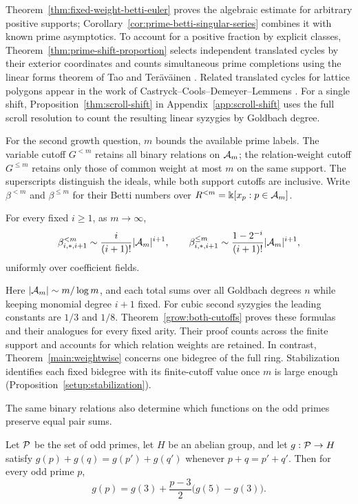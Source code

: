 Theorem~\ref{thm:fixed-weight-betti-euler} proves the algebraic estimate
for arbitrary positive supports; Corollary~\ref{cor:prime-betti-singular-series}
combines it with known prime asymptotics. To account for a positive
fraction by explicit classes, Theorem~\ref{thm:prime-shift-proportion}
selects independent translated cycles by their exterior coordinates
and counts simultaneous prime completions using the linear forms
theorem of Tao and Ter\"av\"ainen \cite[Thm.~1.6]{TT}.
Related
translated cycles for lattice polygons appear in the work of
Castryck--Cools--Demeyer--Lemmens \cite[Secs.~4.1--4.2]{CCDL19}.
For a single shift, Proposition~\ref{thm:scroll-shift} in
Appendix~\ref{app:scroll-shift} uses the full scroll resolution to count
the resulting linear syzygies by Goldbach degree.

For the second growth question, $m$ bounds the available prime labels.
The variable cutoff $G^{<m}$ retains all binary relations on $\mathcal A_m$;
the relation-weight cutoff $G^{\le m}$ retains only those of common
weight at most $m$ on the same support. The superscripts distinguish
the ideals, while both support cutoffs are inclusive. Write
$\beta^{<m}$ and $\beta^{\le m}$ for their Betti numbers over
$R^{<m}=\Bbbk[x_p:p\in\mathcal A_m]$.

\begin{maintheorem}
\label{main:cutoff-growth}
For every fixed $i\ge1$, as $m\to\infty$,
\[
 \beta^{<m}_{i,*,i+1}
       \sim\frac{i}{(i+1)!}|\mathcal A_m|^{i+1},\qquad
 \beta^{\le m}_{i,*,i+1}
       \sim\frac{1-2^{-i}}{(i+1)!}|\mathcal A_m|^{i+1},
\]
uniformly over coefficient fields.
\end{maintheorem}

Here $|\mathcal A_m|\sim m/\log m$, and each total sums over all Goldbach
degrees $n$ while keeping monomial degree $i+1$ fixed. For cubic
second syzygies the leading constants are $1/3$ and $1/8$.
Theorem~\ref{grow:both-cutoffs} proves these formulas and their
analogues for every fixed arity. Their proof counts across the finite
support and accounts for which relation weights are retained.
In contrast, Theorem~\ref{main:weightwise} concerns one bidegree of
the full ring. Stabilization identifies each fixed bidegree with its
finite-cutoff value once $m$ is large enough
(Proposition~\ref{setup:stabilization}).

The same binary relations also determine which functions on the odd
primes preserve equal pair sums.

\begin{maintheorem}\label{main:prime-interpolation}
Let $\mathcal P$ be the set of odd primes, let $H$ be an abelian group,
and let $g:\mathcal P\to H$ satisfy
$g(p)+g(q)=g(p')+g(q')$ whenever $p+q=p'+q'$. Then for every odd prime $p$,
\[
 g(p)=g(3)+\frac{p-3}{2}\bigl(g(5)-g(3)\bigr).
\]
\end{maintheorem}

